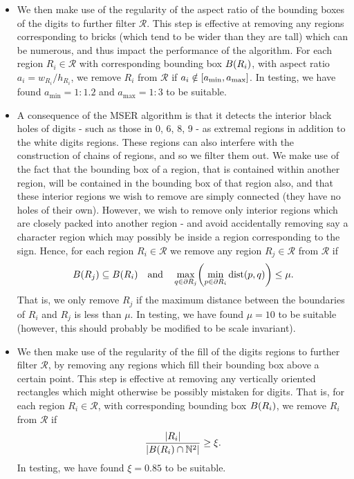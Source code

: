 \documentclass{article}
\begin{document}
\begin{itemize}
\item
  We then make use of the regularity of the aspect ratio of the bounding boxes
  of the digits to further filter $\mathcal{R}$.
  This step is effective at removing any regions corresponding to bricks (which
  tend to be wider than they are tall) which can be numerous, and thus impact
  the performance of the algorithm.
  For each region $R_{i} \in \mathcal{R}$ with corresponding bounding box
  $B(R_{i})$, with aspect ratio $a_{i} = w_{R_{i}} / h_{R_{i}}$, we remove
  $R_{i}$ from $\mathcal{R}$ if $a_{i} \notin [a_{\min}, a_{\max}]$.
  In testing, we have found $a_{\min} = 1:1.2$ and $a_{\max} = 1:3$ to be
  suitable.

\item
  A consequence of the MSER algorithm is that it detects the interior black
  holes of digits - such as those in 0, 6, 8, 9 - as extremal regions in
  addition to the white digits regions.
  These regions can also interfere with the construction of chains of regions,
  and so we filter them out.
  We make use of the fact that the bounding box of a region, that is contained
  within another region, will be contained in the bounding box of that region
  also, and that these interior regions we wish to remove are simply connected
  (they have no holes of their own).
  However, we wish to remove only interior regions which are closely packed into
  another region - and avoid accidentally removing say a character region which
  may possibly be inside a region corresponding to the sign.
  Hence, for each region $R_{i} \in \mathcal{R}$ we remove any region
  $R_{j} \in \mathcal{R}$ from $\mathcal{R}$ if
  \begin{equation*}
    B\lr{R_{j}}
    \subseteq
    B\lr{R_{i}}
    \qq{and}
    \max_{q \in \partial R_{j}}
    \lr[\bigg]
    {
      \min_{p \in \partial R_{i}}
      \mathrm{dist}\lr{p, q}
    }
    \leq
    \mu
    .
  \end{equation*}
  That is, we only remove $R_{j}$ if the maximum distance between the boundaries
  of $R_{i}$ and $R_{j}$ is less than $\mu$.
  In testing, we have found $\mu = 10$ to be suitable (however, this should
  probably be modified to be scale invariant).

\item
  We then make use of the regularity of the fill of the digits regions to
  further filter $\mathcal{R}$, by removing any regions which fill their
  bounding box above a certain point.
  This step is effective at removing any vertically oriented rectangles which
  might otherwise be possibly mistaken for digits.
  That is, for each region $R_{i} \in \mathcal{R}$, with corresponding bounding
  box $B(R_{i})$, we remove $R_{i}$ from $\mathcal{R}$ if
  \begin{equation*}
    \frac
    {
      \lvert
        R_{i}
      \rvert
    }
    {
      \lvert
        B(R_{i})
        \cap
        \mathbb{N}^{2}
      \rvert
    }
    \geq
    \xi
    .
  \end{equation*}
  In testing, we have found $\xi = 0.85$ to be suitable.


\end{itemize}
\end{document}
